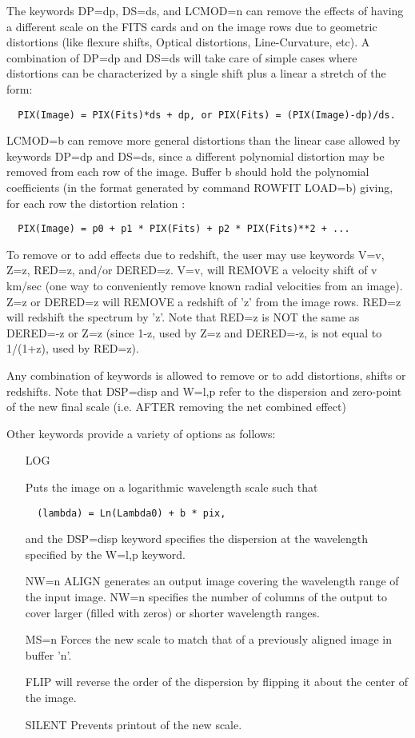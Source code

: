 The keywords DP=dp, DS=ds, and LCMOD=n can remove the effects of having a
different scale on the FITS cards and on the image rows due to geometric
distortions (like flexure shifts, Optical distortions, Line-Curvature,
etc). A combination of DP=dp and DS=ds will take care of simple cases where
distortions can be characterized by a single shift plus a linear a stretch
of the form:
\begin{verbatim} 
  PIX(Image) = PIX(Fits)*ds + dp, or PIX(Fits) = (PIX(Image)-dp)/ds.
\end{verbatim} 

LCMOD=b can remove more general distortions than the linear case allowed by
keywords DP=dp and DS=ds, since a different polynomial distortion may be
removed from each row of the image. Buffer b should hold the polynomial
coefficients (in the format generated by command ROWFIT LOAD=b) giving, for
each row the distortion relation :
\begin{verbatim} 
  PIX(Image) = p0 + p1 * PIX(Fits) + p2 * PIX(Fits)**2 + ...
\end{verbatim} 
To remove or to add effects due to redshift, the user may use keywords V=v,
Z=z, RED=z, and/or DERED=z. V=v, will REMOVE a velocity shift of v km/sec
(one way to conveniently remove known radial velocities from an image). Z=z
or DERED=z will REMOVE a redshift of 'z' from the image rows. RED=z will
redshift the spectrum by 'z'. Note that RED=z is NOT the same as DERED=-z
or Z=z (since 1-z, used by Z=z and DERED=-z, is not equal to 1/(1+z), used
by RED=z).
 
Any combination of keywords is allowed to remove or to add distortions,
shifts or redshifts. Note that DSP=disp and W=l,p refer to the dispersion
and zero-point of the new final scale (i.e. AFTER removing the net combined
effect)

Other keywords provide a variety of options as follows:
\begin{itemize} 
  \item[LOG\hfill]{Puts the image on a logarithmic wavelength scale such
       that
       \begin{verbatim}
  (lambda) = Ln(Lambda0) + b * pix,
       \end{verbatim}
       and the DSP=disp keyword specifies the dispersion at the wavelength
       specified by the W=l,p keyword.}

  \item[NW=n \hfill]{ALIGN generates an output image covering the
       wavelength range of the input image. NW=n specifies the number of
       columns of the output to cover larger (filled with zeros) or shorter
       wavelength ranges.}

  \item[MS=n\hfill]{Forces the new scale to match that of a previously
       aligned image in buffer 'n'.}

  \item[FLIP\hfill]{will reverse the order of the dispersion by flipping it
       about the center of the image.}

  \item[SILENT\hfill]{Prevents printout of the new scale.}
\end{itemize} 

